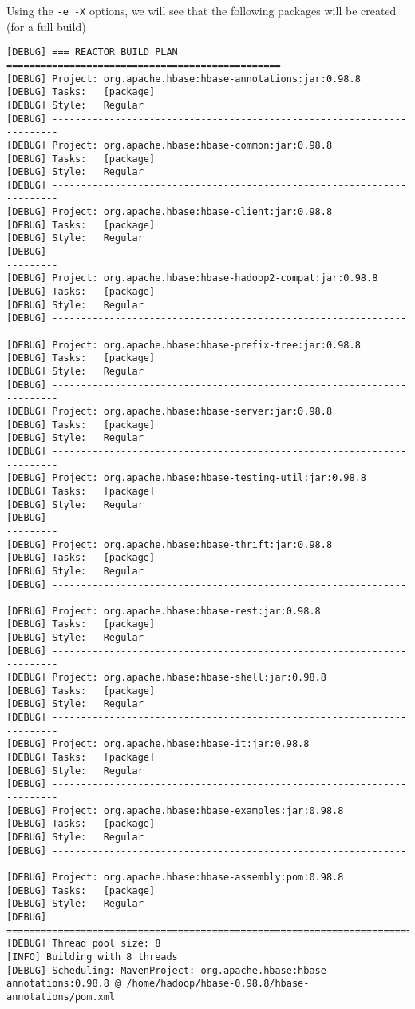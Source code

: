 Using the \verb!-e -X! options, we will see that the following packages will be
created (for a full build)
\begin{verbatim}
[DEBUG] === REACTOR BUILD PLAN ================================================
[DEBUG] Project: org.apache.hbase:hbase-annotations:jar:0.98.8
[DEBUG] Tasks:   [package]
[DEBUG] Style:   Regular
[DEBUG] -----------------------------------------------------------------------
[DEBUG] Project: org.apache.hbase:hbase-common:jar:0.98.8
[DEBUG] Tasks:   [package]
[DEBUG] Style:   Regular
[DEBUG] -----------------------------------------------------------------------
[DEBUG] Project: org.apache.hbase:hbase-client:jar:0.98.8
[DEBUG] Tasks:   [package]
[DEBUG] Style:   Regular
[DEBUG] -----------------------------------------------------------------------
[DEBUG] Project: org.apache.hbase:hbase-hadoop2-compat:jar:0.98.8
[DEBUG] Tasks:   [package]
[DEBUG] Style:   Regular
[DEBUG] -----------------------------------------------------------------------
[DEBUG] Project: org.apache.hbase:hbase-prefix-tree:jar:0.98.8
[DEBUG] Tasks:   [package]
[DEBUG] Style:   Regular
[DEBUG] -----------------------------------------------------------------------
[DEBUG] Project: org.apache.hbase:hbase-server:jar:0.98.8
[DEBUG] Tasks:   [package]
[DEBUG] Style:   Regular
[DEBUG] -----------------------------------------------------------------------
[DEBUG] Project: org.apache.hbase:hbase-testing-util:jar:0.98.8
[DEBUG] Tasks:   [package]
[DEBUG] Style:   Regular
[DEBUG] -----------------------------------------------------------------------
[DEBUG] Project: org.apache.hbase:hbase-thrift:jar:0.98.8
[DEBUG] Tasks:   [package]
[DEBUG] Style:   Regular
[DEBUG] -----------------------------------------------------------------------
[DEBUG] Project: org.apache.hbase:hbase-rest:jar:0.98.8
[DEBUG] Tasks:   [package]
[DEBUG] Style:   Regular
[DEBUG] -----------------------------------------------------------------------
[DEBUG] Project: org.apache.hbase:hbase-shell:jar:0.98.8
[DEBUG] Tasks:   [package]
[DEBUG] Style:   Regular
[DEBUG] -----------------------------------------------------------------------
[DEBUG] Project: org.apache.hbase:hbase-it:jar:0.98.8
[DEBUG] Tasks:   [package]
[DEBUG] Style:   Regular
[DEBUG] -----------------------------------------------------------------------
[DEBUG] Project: org.apache.hbase:hbase-examples:jar:0.98.8
[DEBUG] Tasks:   [package]
[DEBUG] Style:   Regular
[DEBUG] -----------------------------------------------------------------------
[DEBUG] Project: org.apache.hbase:hbase-assembly:pom:0.98.8
[DEBUG] Tasks:   [package]
[DEBUG] Style:   Regular
[DEBUG] =======================================================================
[DEBUG] Thread pool size: 8
[INFO] Building with 8 threads
[DEBUG] Scheduling: MavenProject: org.apache.hbase:hbase-annotations:0.98.8 @ /home/hadoop/hbase-0.98.8/hbase-annotations/pom.xml
\end{verbatim}

